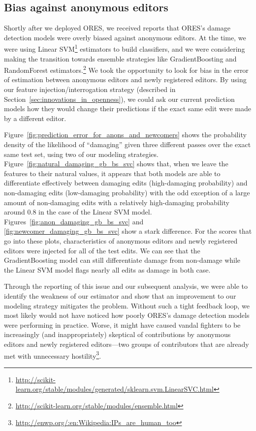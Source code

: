 \subsection{Bias against anonymous editors}

Shortly after we deployed ORES, we received reports that ORES's damage detection models were overly biased against anonymous editors.  At the time, we were using Linear SVM\footnote{\url{http://scikit-learn.org/stable/modules/generated/sklearn.svm.LinearSVC.html}} estimators to build classifiers, and we were considering making the transition towards ensemble strategies like GradientBoosting and RandomForest estimators.\footnote{\url{http://scikit-learn.org/stable/modules/ensemble.html}}  We took the opportunity to look for bias in the error of estimation between anonymous editors and newly registered editors.  By using our feature injection/interrogation strategy (described in Section~\ref{sec:innovations_in_openness}), we could ask our current prediction models how they would change their predictions if the exact same edit were made by a different editor.

Figure~\ref{fig:prediction_error_for_anons_and_newcomers} shows the probability density of the likelihood of ``damaging'' given three different passes over the exact same test set, using two of our modeling strategies.  Figure~\ref{fig:natural_damaging_gb_bs_svc} shows that, when we leave the features to their natural values, it appears that both models are able to differentiate effectively between damaging edits (high-damaging probability) and non-damaging edits (low-damaging probability) with the odd exception of a large amount of non-damaging edits with a relatively high-damaging probability around 0.8 in the case of the Linear SVM model.  Figures~\ref{fig:anon_damaging_gb_bs_svc} and \ref{fig:newcomer_damaging_gb_bs_svc} show a stark difference.  For the scores that go into these plots, characteristics of anonymous editors and newly registered editors were injected for all of the test edits.  We can see that the GradientBoosting model can still differentiate damage from non-damage while the Linear SVM model flags nearly all edits as damage in both case.

Through the reporting of this issue and our subsequent analysis, we were able to identify the weakness of our estimator and show that an improvement to our modeling strategy mitigates the problem.  Without such a tight feedback loop, we most likely would not have noticed how poorly ORES's damage detection models were performing in practice.  Worse, it might have caused vandal fighters to be increasingly (and inappropriately) skeptical of contributions by anonymous editors and newly registered editors---two groups of contributors that are already met with unnecessary hostility\footnote{\url{http://enwp.org/:en:Wikipedia:IPs_are_human_too}}\cite{halfaker2013rise}.
